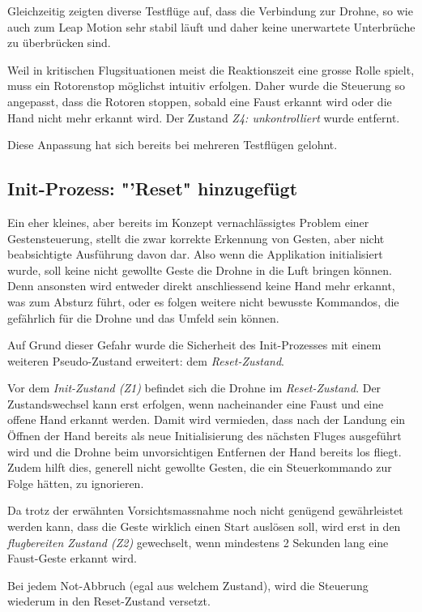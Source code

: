 Gleichzeitig zeigten diverse Testflüge auf, dass die Verbindung zur Drohne, so wie auch zum Leap Motion sehr stabil läuft und daher keine unerwartete Unterbrüche zu überbrücken sind.

Weil in kritischen Flugsituationen meist die Reaktionszeit eine grosse Rolle spielt, muss ein Rotorenstop möglichst intuitiv erfolgen.
Daher wurde die Steuerung so angepasst, dass die Rotoren stoppen, sobald eine Faust erkannt wird oder die Hand nicht mehr erkannt wird.
Der Zustand \textit{Z4: unkontrolliert} wurde entfernt.

Diese Anpassung hat sich bereits bei mehreren Testflügen gelohnt.

\subsection{Init-Prozess: "'Reset" hinzugefügt}
Ein eher kleines, aber bereits im Konzept vernachlässigtes Problem einer Gestensteuerung, stellt die zwar korrekte Erkennung von Gesten, aber nicht beabsichtigte Ausführung davon dar.
Also wenn die Applikation initialisiert wurde, soll keine nicht gewollte  Geste die Drohne in die Luft bringen können.
Denn ansonsten wird entweder direkt anschliessend keine Hand mehr erkannt, was zum Absturz führt, oder es folgen weitere nicht bewusste Kommandos, die gefährlich für die Drohne und das Umfeld sein können.

Auf Grund dieser Gefahr wurde die Sicherheit des Init-Prozesses mit einem weiteren Pseudo-Zustand erweitert: dem \textit{Reset-Zustand}.

Vor dem \textit{Init-Zustand (Z1)} befindet sich die Drohne im \textit{Reset-Zustand}. Der Zustandswechsel kann erst erfolgen, wenn nacheinander eine Faust und eine offene Hand erkannt werden.
Damit wird vermieden, dass nach der Landung ein Öffnen der Hand bereits als neue Initialisierung des nächsten Fluges ausgeführt wird und die Drohne beim unvorsichtigen Entfernen der Hand bereits los fliegt.
Zudem hilft dies, generell nicht gewollte Gesten, die ein Steuerkommando zur Folge hätten, zu ignorieren.

Da trotz der erwähnten Vorsichtsmassnahme noch nicht genügend gewährleistet werden kann, dass die Geste wirklich einen Start auslösen soll, wird erst in den \textit{flugbereiten Zustand (Z2)} gewechselt, wenn mindestens 2 Sekunden lang eine Faust-Geste erkannt wird.

Bei jedem Not-Abbruch (egal aus welchem Zustand), wird die Steuerung wiederum in den Reset-Zustand versetzt.

